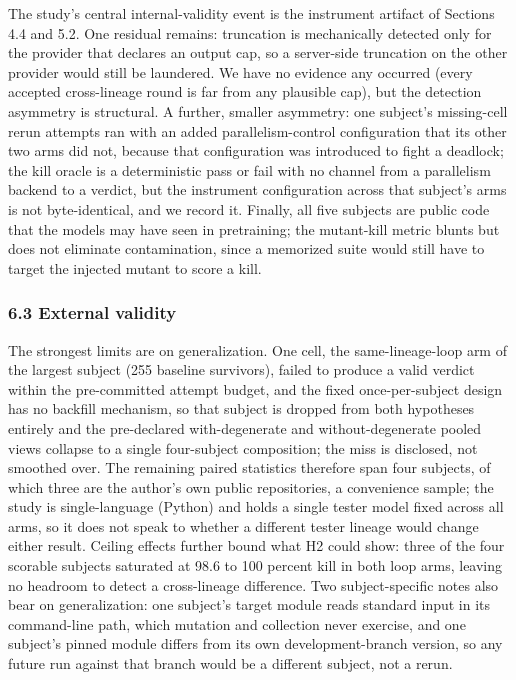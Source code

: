 \documentclass[
  11pt,
]{article}
\begin{document}
The study's central internal-validity event is the instrument artifact
of Sections 4.4 and 5.2. One residual remains: truncation is
mechanically detected only for the provider that declares an output cap,
so a server-side truncation on the other provider would still be
laundered. We have no evidence any occurred (every accepted
cross-lineage round is far from any plausible cap), but the detection
asymmetry is structural. A further, smaller asymmetry: one subject's
missing-cell rerun attempts ran with an added parallelism-control
configuration that its other two arms did not, because that
configuration was introduced to fight a deadlock; the kill oracle is a
deterministic pass or fail with no channel from a parallelism backend to
a verdict, but the instrument configuration across that subject's arms
is not byte-identical, and we record it. Finally, all five subjects are
public code that the models may have seen in pretraining; the
mutant-kill metric blunts but does not eliminate contamination, since a
memorized suite would still have to target the injected mutant to score
a kill.

\subsubsection{6.3 External validity}\label{external-validity}

The strongest limits are on generalization. One cell, the
same-lineage-loop arm of the largest subject (255 baseline survivors),
failed to produce a valid verdict within the pre-committed attempt
budget, and the fixed once-per-subject design has no backfill mechanism,
so that subject is dropped from both hypotheses entirely and the
pre-declared with-degenerate and without-degenerate pooled views
collapse to a single four-subject composition; the miss is disclosed,
not smoothed over. The remaining paired statistics therefore span four
subjects, of which three are the author's own public repositories, a
convenience sample; the study is single-language (Python) and holds a
single tester model fixed across all arms, so it does not speak to
whether a different tester lineage would change either result. Ceiling
effects further bound what H2 could show: three of the four scorable
subjects saturated at 98.6 to 100 percent kill in both loop arms,
leaving no headroom to detect a cross-lineage difference. Two
subject-specific notes also bear on generalization: one subject's target
module reads standard input in its command-line path, which mutation and
collection never exercise, and one subject's pinned module differs from
its own development-branch version, so any future run against that
branch would be a different subject, not a rerun.
\end{document}
